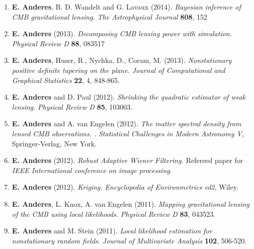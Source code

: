 \documentclass[11pt]{article}
\begin{document}
\begin{enumerate}[labelindent=0pt]


\item
{\bf E. Anderes}, B. D. Wandelt and G. Lavaux (2014). \textsl{Bayesian inference of CMB gravitational lensing.} \textit{The Astrophysical Journal} {\bf 808}, 152




\item
{\bf E. Anderes} (2013).
\textsl{Decomposing CMB lensing power with simulation.} \\
\textit{Physical Review D} {\bf 88}, 083517


\item
{\bf E. Anderes}, Huser, R., Nychka, D., Coram, M. (2013). \textsl{Nonstationary positive definite tapering on the plane.}  \textit{Journal of Computational and Graphical Statistics} {\bf 22}, 4, 848-865.



\item
{\bf E. Anderes} and D. Paul (2012).  \textsl{Shrinking the quadratic estimator of weak lensing.}
\textit{Physical Review D} {\bf 85}, 103003.



\item
{\bf E. Anderes} and A. van Engelen (2012). \textsl{The matter spectral density from lensed CMB observations.
.} \textit{Statistical Challenges in Modern Astronomy V}, Springer-Verlag, New York.


\item
{\bf E. Anderes} (2012).  \textsl{Robust Adaptive Wiener Filtering.}  Refereed paper for \textit{IEEE International conference on image processing}.


\item
{\bf E. Anderes} (2012). \textsl{Kriging.}  \textit{Encyclopedia of Environmetrics ed2}, Wiley.




\item
{\bf E. Anderes}, L. Knox, A. van Engelen (2011).  \textsl{Mapping gravitational lensing of the CMB using local likelihoods.}
\textit{Physical Review D} {\bf 83}, 043523.



\item
{\bf E. Anderes} and M. Stein (2011).  \textsl{Local likelihood estimation for nonstationary random fields.}  \textit{Journal of Multivariate Analysis} {\bf 102}, 506-520.





\end{enumerate}
\end{document}
